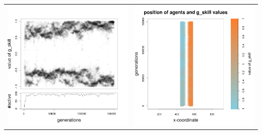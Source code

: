 \documentclass[a4paper,10pt]{article}
\begin{document}
\begin{table}[H]
\begin{tabular}{cc}
 \newline
 \includegraphics[width=\imgSize]{../images/5StaticEnv/Gplot58_staticEnv4}&\includegraphics[width=\imgSize]{../images/5StaticEnv/Gplot58Static_staticEnv4}\\
\end{tabular}

\end{table}
\end{document}
